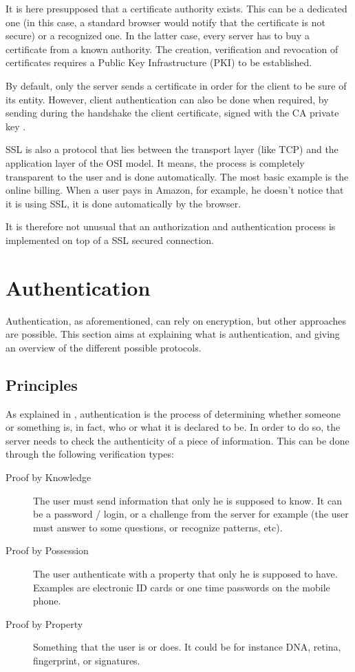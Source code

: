 It is here presupposed that a certificate authority exists. This can be a dedicated one (in this case, a standard browser would notify that the certificate is not secure) or a recognized one. In the latter case, every server has to buy a certificate from a known authority. The creation, verification and revocation of certificates requires a Public Key Infrastructure (PKI) to be established.

By default, only the server sends a certificate in order for the client to be sure of its entity. However, client authentication can also be done when required, by sending during the handshake the client certificate, signed with the CA private key .
 
SSL is also a protocol that lies between the transport layer (like TCP) and the application layer of the OSI model. It means, the process is completely transparent to the user and is done automatically. The most basic example is the online billing. When a user pays in Amazon, for example, he doesn't notice that it is using SSL, it is done automatically by the browser.

It is therefore not unusual that an authorization and authentication process is implemented on top of a SSL secured connection.


\section{Authentication}
\label{02_authentication}

Authentication, as aforementioned, can rely on encryption, but other approaches are possible. This section aims at explaining what is authentication, and giving an overview of the different possible protocols. 

\subsection{Principles}
As explained in \cite{patel2008information}, authentication is the process of determining whether someone or something is, in fact, who or what it is declared to be. In order to do so, the server needs to check the authenticity of a piece of information. This can be done through the following verification types:

\begin{description}
	\item[Proof by Knowledge] The user must send information that only he is supposed to know. It can be a password / login, or a challenge from the server for example (the user must answer to some questions, or recognize patterns, etc).
	\item[Proof by Possession] The user authenticate with a property that only he is supposed to have. Examples are electronic ID cards or one time passwords on the mobile phone.
	\item[Proof by Property] Something that the user is or does. It could be for instance DNA, retina, fingerprint, or signatures. 
\end{description}

